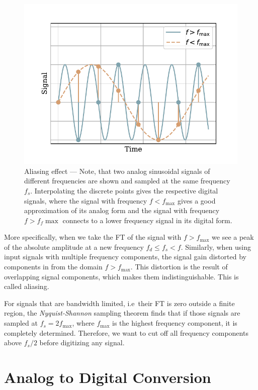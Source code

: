 \begin{figure}[!htb]
  \centering
  \includegraphics[scale=0.72]{figures/electronics/aaf/plot_aliasing}
  \caption[Aliasing]{Aliasing effect --- Note, that two analog sinusoidal signals of different frequencies are shown and sampled at the same frequency $f_s$. Interpolating the discrete points gives the respective digital signals, where the signal with frequency $f<f_{\max}$ gives a good approximation of its analog form and the signal with frequency $f>f_f{\max}$ connects to a lower frequency signal in its digital form.%
    \label{fig:plot_aliasing}}
\end{figure}

More specifically, when we take the \acf{FT} of the signal with $f>f_{\max}$ we see a peak of the absolute amplitude at a new frequency $f_d\leq f_s<f$. Similarly, when using input signals with multiple frequency components, the signal gain distorted by components in from the domain $f>f_{\max}$. This distortion is the result of overlapping signal components, which makes them indistinguishable. This is called aliasing.

For signals that are bandwidth limited, i.e\ their \ac{FT} is zero outside a finite region, the \emph{Nyquist-Shannon} sampling theorem finds that if those signals are sampled at $f_s=2f_{\max}$, where $f_{\max}$ is the highest frequency component, it is completely determined. Therefore, we want to cut off all frequency components above $f_s/2$ before digitizing any signal.
\clearpage

\section{Analog to Digital Conversion}

